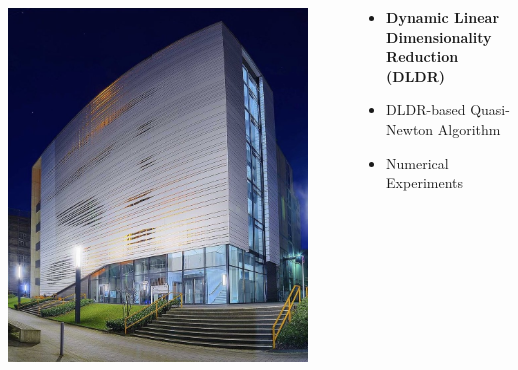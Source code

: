 \documentclass[t]{beamer}
\begin{document}
\begin{frame}

\begin{columns}[c]

\begin{column}{0.5\textwidth}
\begin{center}
\includegraphics[width=0.9\textwidth]{toaster}
\end{center}
\end{column}

\begin{column}{0.5\textwidth}
\begin{itemize}
\item \textbf{Dynamic Linear Dimensionality Reduction (DLDR)} \vspace{1cm}
\item DLDR-based Quasi-Newton Algorithm \vspace{1cm}
\item Numerical Experiments \vspace{1cm} 
\end{itemize}
\end{column}

\end{columns}
\end{frame}
\end{document}
